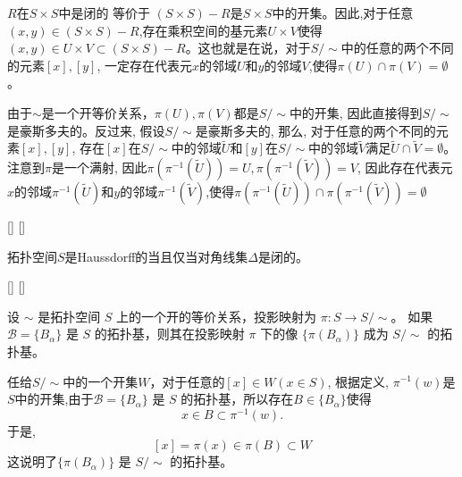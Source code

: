 \documentclass[UTF8]{ctexart}
\begin{document}
    \begin{prf}
        
        
        
        

        $R$在\( S \times S \)中是闭的 等价于 
        $(S \times S) - R$是$S \times S$中的开集。因此,对于任意$(x,y) \in (S \times S) - R$,存在乘积空间的基元素$U \times V$使得$(x,y) \in U \times V \subset (S \times S) - R$。这也就是在说，对于$S / \sim$中的任意的两个不同的元素$[x],[y]$, 一定存在代表元$x$的邻域$U$和$y$的邻域$V$,使得$\pi(U) \cap \pi(V) = \emptyset$。
        
        由于$\sim$是一个开等价关系，$\pi(U) , \pi(V)$都是$S/\sim$中的开集, 因此直接得到$S/\sim$是豪斯多夫的。反过来, 假设$S/\sim$是豪斯多夫的, 那么, 对于任意的两个不同的元素$[x],[y]$, 存在$[x]$在$S/\sim$中的邻域$\tilde{U}$和$[y]$在$S/\sim$中的邻域$\tilde{V}$满足$\tilde{U} \cap \tilde{V} = \emptyset$。注意到$\pi$是一个满射, 因此$\pi(\pi^{-1}(\tilde{U})) = U, \pi(\pi^{-1}(\tilde{V})) = V$, 因此存在代表元$x$的邻域$\pi^{-1}(\tilde{U})$和$y$的邻域$\pi^{-1}(\tilde{V})$,使得$\pi(\pi^{-1}(\tilde{U})) \cap \pi(\pi^{-1}(\tilde{V})) = \emptyset$
    \end{prf}
    
    \begin{crl}
        []
        {}
        []
        []

        拓扑空间$S$是Haussdorff的当且仅当对角线集$\Delta$是闭的。
    \end{crl}

    \begin{thm}
        []
        {}
        []
        []

        设 \( \sim \) 是拓扑空间 \( S \) 上的一个开的等价关系，投影映射为 \( \pi : S \to S/\sim \)。
        如果 \( \mathcal{B} = \{ B_{\alpha} \} \) 是 \( S \) 的拓扑基，则其在投影映射 \( \pi \) 下的像 \( \{ \pi(B_{\alpha}) \} \) 成为 \( S/\sim \) 的拓扑基。
    \end{thm}
    
    \begin{prf}
        
        
        
        

        任给$S/\sim$中的一个开集$W$，对于任意的$[x] \in W(x \in S)$, 根据定义, $\pi^{-1}(w)$是$S$中的开集,由于\( \mathcal{B} = \{ B_{\alpha} \} \) 是 \( S \) 的拓扑基，所以存在$B \in \{ B_{\alpha} \}$使得
        \[
            x \in B \subset \pi^{-1}(w).
        \]
        于是,
        \[
            [x] = \pi(x) \in \pi(B) \subset W
        \]
        这说明了\( \{ \pi(B_{\alpha}) \} \) 是 \( S/\sim \) 的拓扑基。
    \end{prf}
\end{document}
